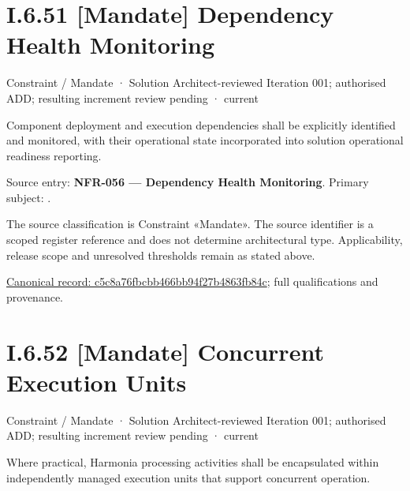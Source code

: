 \section*{I.6.51 [Mandate] Dependency Health Monitoring}
\label{navigation:I.6.51}

\label{element:c5c8a76fbcbb466bb94f27b4863fb84c}
{\small Constraint / Mandate · Solution Architect-reviewed Iteration 001; authorised ADD; resulting increment review pending · current}\par

Component deployment and execution dependencies shall be explicitly identified and monitored, with their operational state incorporated into solution operational readiness reporting.



Source entry: \textbf{NFR-056 — Dependency Health Monitoring}. Primary subject: \texttt{}.



The source classification is Constraint «Mandate». The source identifier is a scoped register reference and does not determine architectural type. Applicability, release scope and unresolved thresholds remain as stated above.


{\footnotesize \href{../../../../../../../../continuum/motivation/constraint/mandate/c5c8a76fbcbb466bb94f27b4863fb84c.md}{Canonical record: c5c8a76fbcbb466bb94f27b4863fb84c}; full qualifications and provenance.}\par
\section*{I.6.52 [Mandate] Concurrent Execution Units}
\label{navigation:I.6.52}

\label{element:12466ce2701146c1b52a9c68c2fb426c}
{\small Constraint / Mandate · Solution Architect-reviewed Iteration 001; authorised ADD; resulting increment review pending · current}\par

Where practical, Harmonia processing activities shall be encapsulated within independently managed execution units that support concurrent operation.



